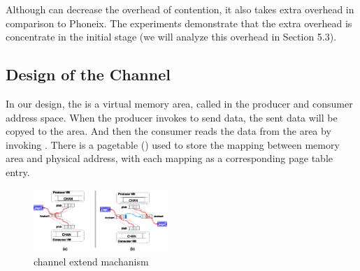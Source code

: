 Although \myth can decrease the overhead of contention,
it also takes extra overhead in comparison to Phoneix. The experiments demonstrate that the extra overhead 
is concentrate in the initial stage (we will analyze this overhead in Section 5.3). 


\subsection{Design of the Channel}
In our design, the  is a virtual memory area, called  in the producer and consumer address space.
When the producer invokes  to send data, the sent data will be copyed to the  area.
And then the consumer reads the data from the  area  by invoking .
There is a pagetable () used to store the mapping between  memory area and physical address, with each mapping as a corresponding page table entry.



\begin{figure}[!h!t]  
	\centering
	\includegraphics[width=0.45\textwidth]{eps/chan_extend.eps}
	\caption{channel extend machanism}
	\label{fig:spmckern:extend}
\end{figure}

